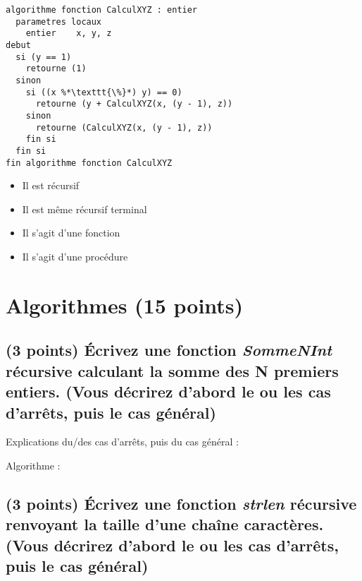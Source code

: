\documentclass[11pt,a4paper]{article}
\begin{document}
\bigskip

\begin{lstlisting}[style=algorithmique]
algorithme fonction CalculXYZ : entier
  parametres locaux
    entier    x, y, z
debut
  si (y == 1)
    retourne (1)
  sinon
    si ((x %*\texttt{\%}*) y) == 0)
      retourne (y + CalculXYZ(x, (y - 1), z))
    sinon
      retourne (CalculXYZ(x, (y - 1), z))
    fin si
  fin si
fin algorithme fonction CalculXYZ \end{lstlisting}

\begin{itemize}
  \item[\CaseCoche] Il est récursif \\
  \item[\CaseCoche] Il est même récursif terminal \\
  \item[\CaseCoche] Il s'agit d'une fonction \\
  \item[\CaseCoche] Il s'agit d'une procédure \\
\end{itemize}


\clearpage

\section{Algorithmes (15 points)}

\subsection{(3 points) \'Ecrivez une fonction \og \textit{SommeNInt} \fg{} récursive calculant la somme des N premiers entiers. (Vous décrirez d'abord le ou les cas d'arrêts, puis le cas général) }

\bigskip

\begin{center}
Explications du/des cas d'arrêts, puis du cas général :

\bigskip

Algorithme :
\end{center}

\smallskip

\clearpage

\subsection{(3 points) \'Ecrivez une fonction \og \textit{strlen} \fg{} récursive renvoyant la taille d'une chaîne caractères.  (Vous décrirez d'abord le ou les cas d'arrêts, puis le cas général) }
\end{document}
